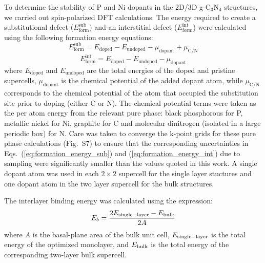 To determine the stability of P and Ni dopants in the 2D/3D g-C$_3$N$_4$ structures, we carried out spin-polarized DFT calculations.  The energy required to create a substitutional defect ($E_{\text{form}}^{\text{sub}}$) and an interstitial defect ($E_{\text{form}}^{\text{int}}$) were calculated using the following formation energy equations:
\begin{equation}
E_{\text{form}}^{\text{sub}} = E_{\text{doped}} - E_{\text{undoped}} - \mu_{\mathrm{dopant}} + \mu_{\mathrm{C/N}}
\label{eq:formation_energy_sub}
\end{equation}
\begin{equation}
E_{\text{form}}^{\text{int}} = E_{\text{doped}} - E_{\text{undoped}} - \mu_{\mathrm{dopant}}
\label{eq:formation_energy_int}
\end{equation}
where $E_{\text{doped}}$ and $E_{\text{undoped}}$ are the total energies of the doped and pristine supercells, $\mu_{\mathrm{dopant}}$ is the chemical potential of the added dopant atom, while $\mu_{\mathrm{C/N}}$ corresponds to the chemical potential of the atom that occupied the substitution site prior to doping (either C or N).
The chemical potential terms were taken as the per atom energy from the relevant pure phase: black phosphorous for P, metallic nickel for Ni, graphite for C and molecular dinitrogen (isolated in a large periodic box) for N.  Care was taken to converge the k-point grids for these pure phase calculations (Fig.~S7) to ensure that the corresponding uncertainties in Eqs.\ (\ref{eq:formation_energy_sub}) and (\ref{eq:formation_energy_int}) due to sampling were significantly smaller than the values quoted in this work.
A single dopant atom was used in each $2 \times 2$ supercell for the single layer stuctures and one dopant atom in the two layer supercell for the bulk structures.

The interlayer binding energy was calculated using the expression:\cite{Bian2022StrongMaterials,Jung2018APrinciples}
\begin{equation}
E_b = \frac{2E_{\rm single-layer} - E_{\rm bulk}}{2A}
\label{eq:binding}
\end{equation}
where \(A\) is the basal-plane area of the bulk unit cell, \(E_{\rm single-layer}\) is the total energy of the optimized monolayer, and \(E_{\rm bulk}\) is the total energy of the corresponding two-layer bulk supercell.

